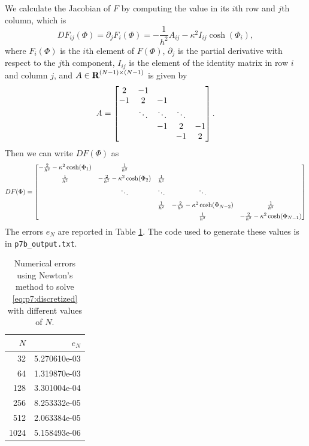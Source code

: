 \documentclass{homework}
\begin{document}
	\begin{alphaparts}
		\questionpart We calculate the Jacobian of $F$ by computing the value in its $i$th row and $j$th column, which is
		\begin{equation*}
			DF_{ij}(\Phi) = \partial_jF_i(\Phi) = -\frac{1}{h^2}A_{ij} - \kappa^2I_{ij}\cosh(\Phi_i),
		\end{equation*}
		where $F_i(\Phi)$ is the $i$th element of $F(\Phi)$, $\partial_j$ is the partial derivative with respect to the $j$th component, $I_{ij}$ is the element of the identity matrix in row $i$ and column $j$, and $A \in \textbf{R}^{(N-1)\times(N-1)}$ is given by
		\begin{equation*}
			A = \left[\begin{matrix}
				2 & - 1 \\
				-1 & 2 & -1 \\
				& \ddots & \ddots & \ddots \\
				& & -1 & 2 & -1 \\
				& & & -1 & 2
			\end{matrix}\right].
		\end{equation*}
		Then we can write $DF(\Phi)$ as
		\begin{equation*}
			DF(\Phi) = \left[\begin{matrix}
				-\frac{2}{h^2} - \kappa^2\cosh(\Phi_1) & \frac{1}{h^2} \\[0.5em]
				\frac{1}{h^2} & -\frac{2}{h^2} - \kappa^2\cosh(\Phi_2) & \frac{1}{h^2} \\[0.5em]
				& \ddots & \ddots & \ddots \\[0.5em]
				& & \frac{1}{h^2} & -\frac{2}{h^2} - \kappa^2\cosh(\Phi_{N-2}) & \frac{1}{h^2} \\[0.5em]
				& & & \frac{1}{h^2} & -\frac{2}{h^2} - \kappa^2\cosh(\Phi_{N-1})
			\end{matrix}\right]
		\end{equation*}
		\questionpart The errors $e_N$ are reported in Table \ref{table:p7b}. The code used to generate these values is in \texttt{p7b\_output.txt}.
		\begin{table}[htb!]
			\centering
			\begin{tabular}{@{}rr@{}}
				\toprule
				$N$ & $e_N$ \\
				\midrule
				32 & 5.270610e-03 \\
				64 & 1.319870e-03 \\
				128 & 3.301004e-04 \\
				256 & 8.253332e-05 \\
				512 & 2.063384e-05 \\
				1024 & 5.158493e-06 \\
				\bottomrule
			\end{tabular}
			\caption{Numerical errors using Newton's method to solve \eqref{eq:p7:discretized} with different values of $N$.}
			\label{table:p7b}
		\end{table}
		

\end{alphaparts}
\end{document}
